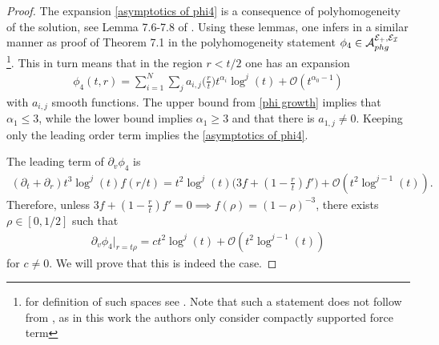 \documentclass[11pt, oneside]{amsart}
\begin{document}
	\begin{proof}
		The expansion \cref{asymptotics of phi4} is a consequence of polyhomogeneity of the solution, see Lemma 7.6-7.8 of \cite{hintz_stability_2020}. Using these lemmas, one infers in a similar manner as proof of Theorem 7.1 in \cite{hintz_stability_2020} the  polyhomogeneity statement $\phi_4\in\mathcal{A}_{phg}^{\mathcal{E}_+,\mathcal{E}_{\mathcal{I}}}$ \footnote{for definition of such spaces see \cite{hintz_stability_2020}. Note that such a statement does not follow from \cite{baskin_asymptotics_2018}, as in this work the authors only consider compactly supported force term}. This in turn means that in the region $r<t/2$ one has an expansion
		\begin{equation*}
			\begin{gathered}
				\phi_4(t,r)=\sum_{i=1}^N\sum_ja_{i,j}\big(\frac{r}{t}\big) t^{\alpha_i}\log^j(t)+\mathcal{O}(t^{\alpha_0-1})
			\end{gathered}
		\end{equation*}
		with $a_{i,j}$ smooth functions. The upper bound from \cref{phi growth} implies that $\alpha_1\leq3$, while the lower bound implies $\alpha_1\geq3$ and that there is $a_{1,j}\neq0$. Keeping only the leading order term implies the \cref{asymptotics of phi4}.
		
		The leading term of $\partial_v\phi_4$ is
		\begin{equation*}
			\begin{gathered}
				(\partial_t+\partial_r)t^3\log^j(t)f(r/t)=t^2\log^{j}(t)\Big(3f+(1-\frac{r}{t})f'\Big)+\mathcal{O}(t^2\log^{j-1}(t)).
			\end{gathered}
		\end{equation*}
		Therefore, unless $3f+(1-\frac{r}{t})f'=0\implies f(\rho)=(1-\rho)^{-3}$, there exists $\rho\in[0,1/2]$ such that 
		\begin{equation*}
			\begin{gathered}
				 \partial_v\phi_4|_{r=t\rho}=ct^2\log^j(t)+\mathcal{O}(t^2\log^{j-1}(t))
			\end{gathered}
		\end{equation*}
		for $c\neq0$. We will prove that this is indeed the case.
		

\end{proof}
\end{document}
